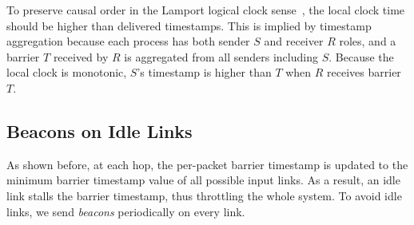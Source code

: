 


To preserve causal order in the Lamport logical clock sense~\cite{lamport1978time}, the local clock time should be higher than delivered timestamps.
This is implied by timestamp aggregation because each process has both sender $S$ and receiver $R$ roles, and a barrier $T$ received by $R$ is aggregated from all senders including $S$.
Because the local clock is monotonic, $S$'s timestamp is higher than $T$ when $R$ receives barrier $T$.



\subsection{Beacons on Idle Links}
\label{sec:beacon}

As shown before, at each hop, the per-packet barrier timestamp is updated to the minimum barrier timestamp value of all possible input links.
As a result, an idle link stalls the barrier timestamp, thus throttling the whole system.
To avoid idle links, we send \textit{beacons} periodically on every link.



